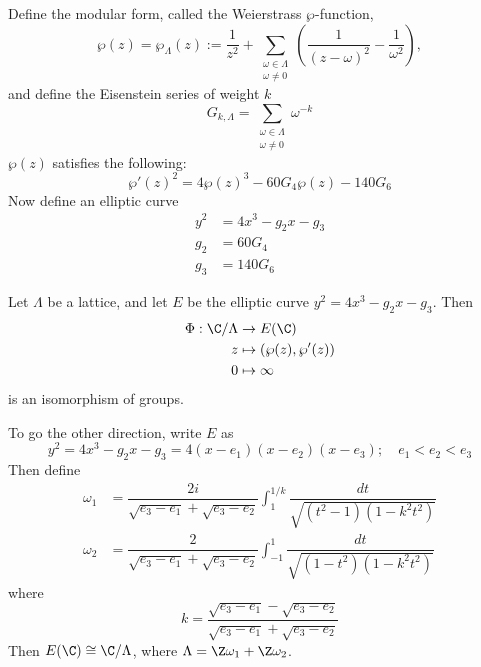 \begin{frame}[plain]
\phantom{x} \par
Define the modular form, called the Weierstrass $\wp$-function,
	\[
	\wp(z)= \wp_\Lambda(z):= \dfrac{1}{z^2} + \sum_{\substack{\omega \in \Lambda \\ \omega \neq 0}} \left( \dfrac{1}{(z - \omega)^2} - \dfrac{1}{\omega^2} \right),
	\]
and define the Eisenstein series of weight $k$
	\[
	G_{k,\Lambda}= \sum_{\substack{\omega \in \Lambda \\ \omega \neq 0}} \omega^{-k}
	\]
$\wp(z)$ satisfies the following:
	\[
	\wp'(z)^2= 4\wp(z)^3 - 60G_4\wp(z) - 140 G_6
	\]
Now define an elliptic curve	
	\[
	\begin{aligned}
	y^2&= 4x^3 - g_2 x - g_3 \\
	g_2&= 60 G_4 \\
	g_3&= 140 G_6
	\end{aligned}
	\]
\end{frame}



\begin{frame}[plain]

\begin{thm}
Let $\Lambda$ be a lattice, and let $E$ be the elliptic curve $y^2= 4x^3 - g_2x - g_3$. Then
	\[
	\begin{aligned}
	\Phi: \C/\Lambda &\to E(\C) \\
	z &\mapsto (\wp(z),\wp'(z)) \\
	0 &\mapsto \infty
	\end{aligned}
	\]
is an isomorphism of groups.
\end{thm}
\end{frame}



\begin{frame}[plain]
To go the other direction, write $E$ as 
	\[
	y^2= 4x^3 - g_2 x - g_3 = 4(x - e_1)(x - e_2)(x - e_3); \quad e_1<e_2<e_3
	\]
Then define
	\[
	\begin{aligned}
	\omega_1&= \dfrac{2i}{\sqrt{e_3-e_1} + \sqrt{e_3-e_2}} \int_1^{1/k} \dfrac{dt}{\sqrt{(t^2-1)(1-k^2t^2)}} \\
	\omega_2&= \dfrac{2}{\sqrt{e_3-e_1} + \sqrt{e_3-e_2}} \int_{-1}^1 \dfrac{dt}{\sqrt{(1-t^2)(1-k^2t^2)}}
	\end{aligned}
	\]
where
	\[
	k= \dfrac{\sqrt{e_3-e_1} - \sqrt{e_3-e_2}}{\sqrt{e_3-e_1} + \sqrt{e_3-e_2}}
	\] \pspace
Then $E(\C) \cong \C/\Lambda$, where $\Lambda= \Z \omega_1 + \Z\omega_2$.
\end{frame}



